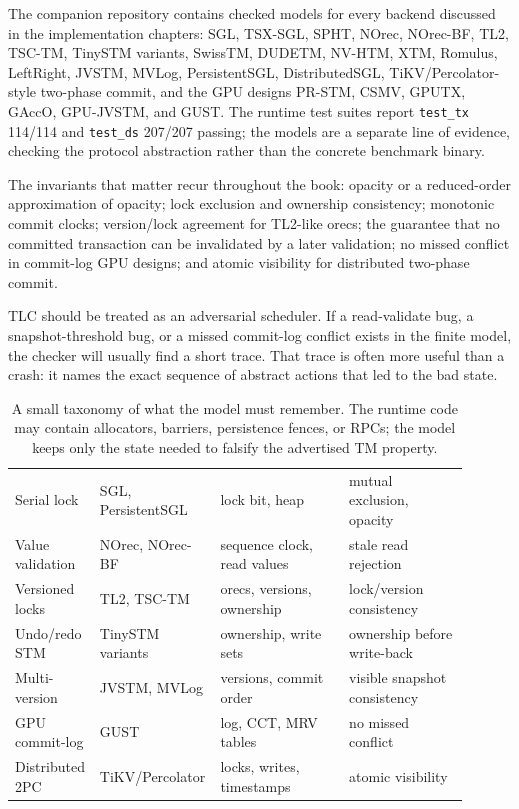 The companion repository contains checked models for every backend discussed in
the implementation chapters: SGL, TSX-SGL, SPHT, NOrec, NOrec-BF, TL2, TSC-TM,
TinySTM variants, SwissTM, DUDETM, NV-HTM, XTM, Romulus, LeftRight, JVSTM,
MVLog, PersistentSGL, DistributedSGL, TiKV/Percolator-style two-phase commit,
and the GPU designs PR-STM, CSMV, GPUTX, GAccO, GPU-JVSTM, and GUST.  The
runtime test suites report \texttt{test\_tx} 114/114 and \texttt{test\_ds}
207/207 passing; the models are a separate line of evidence, checking the
protocol abstraction rather than the concrete benchmark binary.

The invariants that matter recur throughout the book: opacity or a reduced-order
approximation of opacity; lock exclusion and ownership consistency; monotonic
commit clocks; version/lock agreement for TL2-like orecs; the guarantee that no
committed transaction can be invalidated by a later validation; no missed
conflict in commit-log GPU designs; and atomic visibility for distributed
two-phase commit.

TLC should be treated as an adversarial scheduler.  If a read-validate bug, a
snapshot-threshold bug, or a missed commit-log conflict exists in the finite
model, the checker will usually find a short trace.  That trace is often more
useful than a crash: it names the exact sequence of abstract actions that led to
the bad state.

\begin{table}[htbp]
\centering
\small
\begin{tabular}{M{0.15\linewidth}M{0.21\linewidth}M{0.28\linewidth}M{0.26\linewidth}}
\hline
{} &  &  &  \\
\hline
Serial lock & SGL, PersistentSGL & lock bit, heap & mutual exclusion, opacity \\
Value validation & NOrec, NOrec-BF & sequence clock, read values & stale read rejection \\
Versioned locks & TL2, TSC-TM & orecs, versions, ownership & lock/version consistency \\
Undo/redo STM & TinySTM variants & ownership, write sets & ownership before write-back \\
Multi-version & JVSTM, MVLog & versions, commit order & visible snapshot consistency \\
GPU commit-log & GUST & log, CCT, MRV tables & no missed conflict \\
Distributed 2PC & TiKV/Percolator & locks, writes, timestamps & atomic visibility \\
\hline
\end{tabular}
\caption{A small taxonomy of what the model must remember. The runtime code may contain allocators, barriers, persistence fences, or RPCs; the model keeps only the state needed to falsify the advertised TM property.}
\label{tab:tla-taxonomy}
\end{table}

